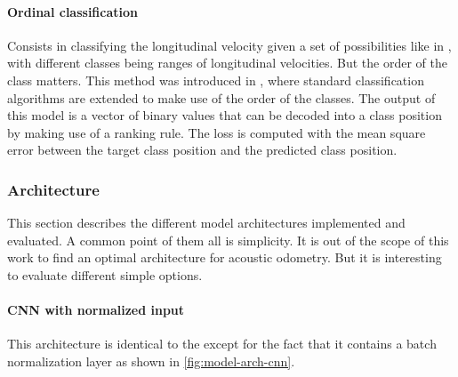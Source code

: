 \paragraph{Ordinal classification} \label{para:model-task-ord-class} Consists
in classifying the longitudinal velocity given a set of possibilities like in
, with different classes being ranges of
longitudinal velocities. But the order of the class matters. This method was
introduced in \cite{ordclass2006}, where standard classification algorithms are
extended to make use of the order of the classes. The output of this model is a
vector of binary values that can be decoded into a class position by making use
of a ranking rule. The loss is computed with the mean square error between the
target class position and the predicted class position. 

\subsubsection{Architecture} \label{subsec:model-architecture}

This section describes the different model architectures implemented and
evaluated. A common point of them all is simplicity. It is out of the scope of
this work to find an optimal architecture for acoustic odometry. But it is
interesting to evaluate different simple options.

\paragraph{CNN with normalized input} \label{para:model-arch-norm-cnn} This
architecture is identical to the  except for the
fact that it contains a batch normalization layer \cite{batchnorm2015} as shown
in \cref{fig:model-arch-cnn}.